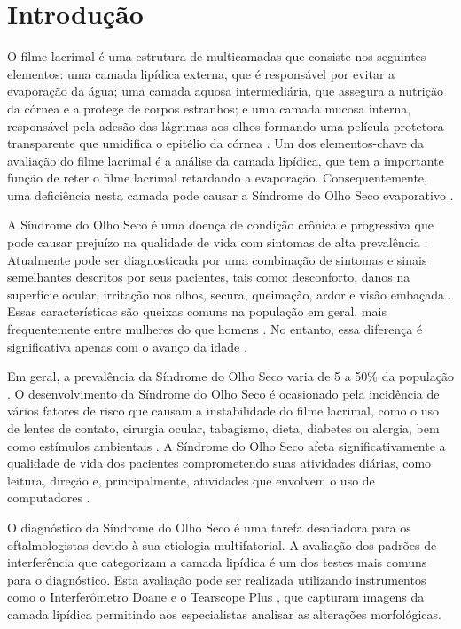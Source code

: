 \chapter{Introdução}
\phantom{0}

O filme lacrimal é uma estrutura de multicamadas que consiste nos seguintes elementos: uma camada lipídica externa, que é responsável por evitar a evaporação da água; uma camada aquosa intermediária, que assegura a nutrição da córnea e a protege de corpos estranhos; e uma camada mucosa interna, responsável pela adesão das lágrimas aos olhos formando uma película protetora transparente que umidifica o epitélio da córnea \cite{rolando2001ocular}. Um dos elementos-chave da avaliação do filme lacrimal é a análise da camada lipídica, que tem a importante função de reter o filme lacrimal retardando a evaporação. Consequentemente, uma deficiência nesta camada pode causar a Síndrome do Olho Seco evaporativo \cite{korb2002tear}.

A Síndrome do Olho Seco é uma doença de condição crônica e progressiva que pode causar prejuízo na qualidade de vida com sintomas de alta prevalência \cite{janine2007epidemiology}. Atualmente pode ser diagnosticada por uma combinação de sintomas e sinais semelhantes descritos por seus pacientes, tais como: desconforto, danos na superfície ocular, irritação nos olhos, secura, queimação, ardor e visão embaçada \cite{begley2002use, listed2007definition}. Essas características são queixas comuns na população em geral, mais frequentemente entre mulheres do que homens \cite{moss2000prevalence}. No entanto, essa diferença é significativa apenas com o avanço da idade \cite{schaumberg2003prevalence}.

Em geral, a prevalência da Síndrome do Olho Seco varia de 5 a 50\% da população \cite{STAPLETON2017334}. O desenvolvimento da Síndrome do Olho Seco é ocasionado pela incidência de vários fatores de risco que causam a instabilidade do filme lacrimal, como o uso de lentes de contato, cirurgia ocular, tabagismo, dieta, diabetes ou alergia, bem como estímulos ambientais \cite{sweeney2013tear}. A Síndrome do Olho Seco afeta significativamente a qualidade de vida dos pacientes comprometendo suas atividades diárias, como leitura, direção e, principalmente, atividades que envolvem o uso de computadores \cite{tong2010impact, miljanovic2007impact}.

O diagnóstico da Síndrome do Olho Seco é uma tarefa desafiadora para os oftalmologistas devido à sua etiologia multifatorial. A avaliação dos padrões de interferência que categorizam a camada lipídica é um dos testes mais comuns para o diagnóstico. Esta avaliação pode ser realizada utilizando instrumentos como o Interferômetro Doane \cite{doane1989instrument} e o Tearscope Plus \cite{GUILLON1998S31}, que capturam imagens da camada lipídica permitindo aos especialistas analisar as alterações morfológicas. %

